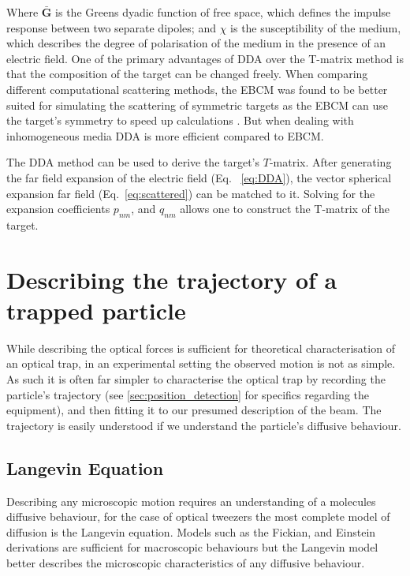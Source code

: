 Where $\mathbf{\bar{G}}$ is the Greens dyadic function of free space, 
which defines the impulse response between two separate dipoles; and 
$\chi$ is the susceptibility of the medium, which describes the 
degree of polarisation of the medium in the presence of an electric 
field. One of the primary advantages of DDA over the T-matrix method 
is that the composition of the target can be changed freely. When 
comparing different computational scattering methods, the EBCM was 
found to be better suited for simulating the scattering of symmetric
targets as the EBCM can use the target's symmetry to speed up 
calculations \cite{Wriedt1998}. But when dealing with inhomogeneous 
media DDA is more efficient compared to EBCM. 

The DDA method can be used to derive the target's $T$-matrix. After
generating the far field expansion of the electric field (Eq.~
\eqref{eq:DDA}), the vector spherical expansion far field 
(Eq.~\eqref{eq:scattered}) can be matched to it. Solving for the 
expansion coefficients $p_{nm}$, and $q_{nm}$ allows one to construct
the T-matrix of the target. 
\newpage
\section{Describing the trajectory of a trapped particle}
While describing the optical forces is sufficient for 
theoretical characterisation of an optical trap, in an 
experimental setting the observed motion is not as 
simple. As such it is often far simpler to 
characterise the optical trap by recording the particle's
trajectory (see \ref{sec:position_detection} for 
specifics regarding the equipment), and then fitting it 
to our presumed description of the beam. The trajectory 
is easily understood if we understand the particle's 
diffusive behaviour.

\subsection{Langevin Equation}
Describing any microscopic motion requires an understanding 
of a molecules diffusive behaviour, for the case of optical 
tweezers the most complete model of diffusion is the Langevin 
equation. Models such as the Fickian, and Einstein derivations 
are sufficient for macroscopic behaviours but the Langevin 
model better describes the microscopic characteristics of 
any diffusive behaviour.
 

